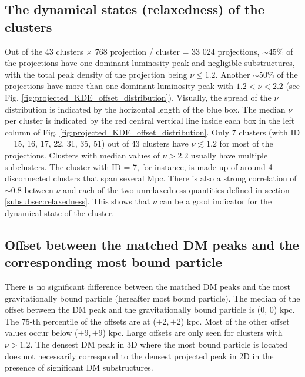 \subsection{The dynamical states (relaxedness) of the clusters}
Out of the 43 clusters $ \times$ 768 projection / cluster  = 33 024 projections, $\sim 45\%$ of the projections 
have one dominant luminosity peak and negligible substructures, with the total peak density of the
projection being $\nu \leq 1.2$. 
Another $\sim 50\%$ of the projections have more than one dominant luminosity
peak with $1.2 < \nu < 2.2$ (see Fig.
\ref{fig:projected_KDE_offset_distribution}).
Visually, the spread of the $\nu$ distribution is indicated by the horizontal 
length of the blue box. 
The median $\nu$ per cluster is indicated by the red central vertical line
inside each box in the left column of Fig. 
\ref{fig:projected_KDE_offset_distribution}.
Only 7 clusters (with ID = 15, 16, 17, 22, 31, 35, 51) out of 43 clusters have $\nu
\lesssim 1.2$ for most of the projections.
Clusters with median values of $\nu > 2.2$ usually have multiple subclusters.
The cluster with ID = 7, for instance, is made up of around 4 disconnected clusters that span
several Mpc.  
There is also a strong correlation of $\sim 0.8$ between $\nu$ and 
each of the two unrelaxedness quantities defined in section 
\ref{subsubsec:relaxedness}. 
This shows that $\nu$ can be a good indicator for the dynamical state of the
cluster.


\subsection{Offset between the matched DM peaks and the corresponding most
bound particle}
\label{subsec:offset_from_most_bound_particle}
There is no significant difference between the matched DM peaks and 
the most gravitationally 
bound particle (hereafter most bound particle).
The median of the offset between the DM peak and the gravitationally bound
particle is (0, 0) kpc. The 75-th percentile of the offsets are at ($\pm2,\pm2$) kpc. 
Most of the other offset values occur below ($\pm 9, \pm 9$) kpc. Large offsets
are only seen for clusters with $\nu > 1.2$. The densest DM peak in 3D where
the most bound particle is located does not
necessarily correspond to the densest projected peak in 2D in the presence of 
significant DM substructures.   

